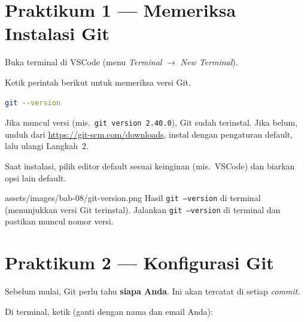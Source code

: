 \section{Praktikum 1 --- Memeriksa Instalasi Git}
\label{sec:git-praktik-1}

\begin{langkah}
  \item Buka terminal di VSCode (menu \emph{Terminal} $\rightarrow$ \emph{New Terminal}).
  \item Ketik perintah berikut untuk memeriksa versi Git.
\end{langkah}

\begin{lstlisting}[language=bash, caption={Memeriksa versi Git}, label={lst:git-version}]
git --version
\end{lstlisting}

\begin{langkah}
  \item Jika muncul versi (mis.\ \texttt{git version 2.40.0}), Git sudah terinstal. Jika belum, unduh dari \url{https://git-scm.com/downloads}, instal dengan pengaturan default, lalu ulangi Langkah~2.
\end{langkah}

\begin{catatan}
Saat instalasi, pilih editor default sesuai keinginan (mis.\ VSCode) dan biarkan opsi lain default.
\end{catatan}

\begin{tangkapanlayar}
  {assets/images/bab-08/git-version.png}
  {Hasil \texttt{git --version} di terminal (menunjukkan versi Git terinstal).}
  {Jalankan \texttt{git --version} di terminal dan pastikan muncul nomor versi.}
\end{tangkapanlayar}

\section{Praktikum 2 --- Konfigurasi Git}
\label{sec:git-praktik-2}

Sebelum mulai, Git perlu tahu \textbf{siapa Anda}. Ini akan tercatat di setiap \emph{commit}.

\begin{langkah}
  \item Di terminal, ketik (ganti dengan nama dan email Anda):
\end{langkah}

